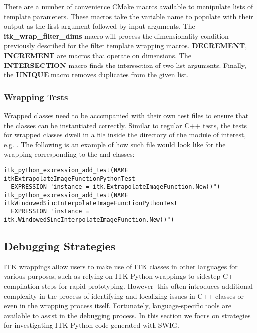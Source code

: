 There are a number of convenience CMake macros available to manipulate lists
of template parameters. These macros take the variable name to populate with
their output as the first argument followed by input arguments. The
\textbf{itk\_wrap\_filter\_dims} macro will process the dimensionality
condition previously described for the filter template wrapping macros.
\textbf{DECREMENT}, \textbf{INCREMENT} are macros that operate on dimensions.
The \textbf{INTERSECTION} macro finds the intersection of two list arguments.
Finally, the \textbf{UNIQUE} macro removes duplicates from the given list.


\subsubsection{Wrapping Tests}

Wrapped classes need to be accompanied with their own test files to ensure that
the classes can be instantiated correctly. Similar to regular C++ tests, the
tests for wrapped classes dwell in a  file inside the
 directory of the module of interest, e.g.
. The
following is an example of how such file would look like for the wrapping
corresponding to the  and
 classes:

\begin{verbatim}
itk_python_expression_add_test(NAME itkExtrapolateImageFunctionPythonTest
  EXPRESSION "instance = itk.ExtrapolateImageFunction.New()")
itk_python_expression_add_test(NAME itkWindowedSincInterpolateImageFunctionPythonTest
  EXPRESSION "instance = itk.WindowedSincInterpolateImageFunction.New()")
\end{verbatim}


\subsection{Debugging Strategies}
\label{subsec:DebuggingStrategies}

ITK wrappings allow users to make use of ITK classes in other languages for various
purposes, such as relying on ITK Python wrappings to sidestep C++ compilation steps
for rapid prototyping. However, this often introduces additional complexity in the
process of identifying and localizing issues in C++ classes or even in the wrapping
process itself. Fortunately, language-specific tools are available to assist in
the debugging process. In this section we focus on strategies for investigating
ITK Python code generated with SWIG.

